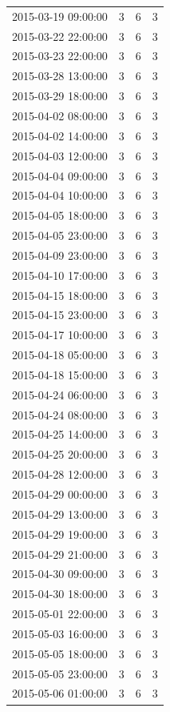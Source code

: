 \begin{tabular}{lrrr}
2015-03-19 09:00:00 & 3 & 6 & 3 \\
2015-03-22 22:00:00 & 3 & 6 & 3 \\
2015-03-23 22:00:00 & 3 & 6 & 3 \\
2015-03-28 13:00:00 & 3 & 6 & 3 \\
2015-03-29 18:00:00 & 3 & 6 & 3 \\
2015-04-02 08:00:00 & 3 & 6 & 3 \\
2015-04-02 14:00:00 & 3 & 6 & 3 \\
2015-04-03 12:00:00 & 3 & 6 & 3 \\
2015-04-04 09:00:00 & 3 & 6 & 3 \\
2015-04-04 10:00:00 & 3 & 6 & 3 \\
2015-04-05 18:00:00 & 3 & 6 & 3 \\
2015-04-05 23:00:00 & 3 & 6 & 3 \\
2015-04-09 23:00:00 & 3 & 6 & 3 \\
2015-04-10 17:00:00 & 3 & 6 & 3 \\
2015-04-15 18:00:00 & 3 & 6 & 3 \\
2015-04-15 23:00:00 & 3 & 6 & 3 \\
2015-04-17 10:00:00 & 3 & 6 & 3 \\
2015-04-18 05:00:00 & 3 & 6 & 3 \\
2015-04-18 15:00:00 & 3 & 6 & 3 \\
2015-04-24 06:00:00 & 3 & 6 & 3 \\
2015-04-24 08:00:00 & 3 & 6 & 3 \\
2015-04-25 14:00:00 & 3 & 6 & 3 \\
2015-04-25 20:00:00 & 3 & 6 & 3 \\
2015-04-28 12:00:00 & 3 & 6 & 3 \\
2015-04-29 00:00:00 & 3 & 6 & 3 \\
2015-04-29 13:00:00 & 3 & 6 & 3 \\
2015-04-29 19:00:00 & 3 & 6 & 3 \\
2015-04-29 21:00:00 & 3 & 6 & 3 \\
2015-04-30 09:00:00 & 3 & 6 & 3 \\
2015-04-30 18:00:00 & 3 & 6 & 3 \\
2015-05-01 22:00:00 & 3 & 6 & 3 \\
2015-05-03 16:00:00 & 3 & 6 & 3 \\
2015-05-05 18:00:00 & 3 & 6 & 3 \\
2015-05-05 23:00:00 & 3 & 6 & 3 \\
2015-05-06 01:00:00 & 3 & 6 & 3 \\

\end{tabular}
